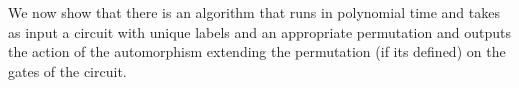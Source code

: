 \documentclass[../paper.tex]{subfiles}
\begin{document}
We now show that there is an algorithm that runs in polynomial time and takes as
input a circuit with unique labels and an appropriate permutation and outputs
the action of the automorphism extending the permutation (if its defined) on the
gates of the circuit.


  

\end{document}

